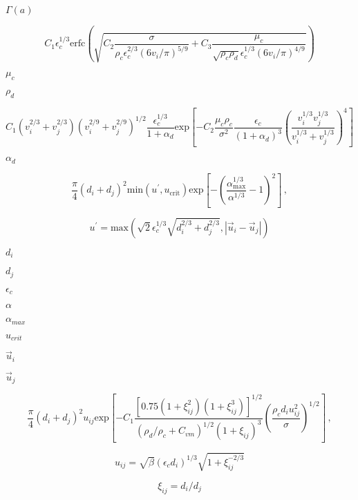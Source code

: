 \documentclass{article}
\begin{document}
$        \Gamma(a)   $
\pagebreak

\[
    C_1 \epsilon_c^{1/3}
    \mathrm{erfc}
    \left(
        \sqrt
        {
            C_2 \frac{\sigma}{\rho_c \epsilon_c^{2/3} (6v_i/\pi)^{5/9}}
          + C_3 \frac{\mu_c}{\sqrt{\rho_c \rho_d}
            \epsilon_c^{1/3} (6v_i/\pi)^{4/9}}
        }
    \right)
\]
\pagebreak

$        \mu_c       $
\pagebreak

$        \rho_d      $
\pagebreak

\[
    C_1 (v_i^{2/3} + v_j^{2/3}) (v_i^{2/9} + v_j^{2/9})^{1/2}
    \frac{\epsilon_c^{1/3}}{1 + \alpha_d}
    \textrm{exp}
    \left[
      - C_2 \frac{\mu_c \rho_c}{\sigma^2}
        \frac{\epsilon_c}{(1 + \alpha_d)^{3}}
        \left(
            \frac{v_i^{1/3} v_j^{1/3}}{v_i^{1/3} + v_j^{1/3}}
        \right)^{4}
    \right]
\]
\pagebreak

$        \alpha_d    $
\pagebreak

\[
    \frac{\pi}{4} (d_i + d_j)^2 \mathrm{min}(u^{\prime}, u_{\mathrm{crit}})
    \mathrm{exp}
    \left[
      - \left(\frac{\alpha_{\mathrm{max}}^{1/3}}{\alpha^{1/3}} - 1\right)^2
    \right]\,,
\]
\pagebreak

\[
    u^{\prime}
  =
    \mathrm{max}
    \left(
        \sqrt{2} \epsilon_c^{1/3} \sqrt{d_i^{2/3} + d_j^{2/3}},
        |\vec{u}_i - \vec{u}_j|
    \right)
\]
\pagebreak

$        d_i           $
\pagebreak

$        d_j           $
\pagebreak

$        \epsilon_c    $
\pagebreak

$        \alpha        $
\pagebreak

$        \alpha_{max}  $
\pagebreak

$        u_{crit}      $
\pagebreak

$        \vec{u}_i     $
\pagebreak

$        \vec{u}_j     $
\pagebreak

\[
    \frac{\pi}{4} (d_i + d_j)^2 u_{ij}
    \mathrm{exp}
    \left[
      - C_1
        \frac
        {[0.75(1 + \xi_{ij}^2)(1 + \xi_{ij}^3)]^{1/2}}
        {(\rho_d/\rho_c + C_{vm})^{1/2} (1 + \xi_{ij})^3}
        \left(\frac{\rho_c d_i u_{ij}^2}{\sigma}\right)^{1/2}
    \right]\,,
\]
\pagebreak

\[
    u_{ij} = \sqrt{\beta} (\epsilon_c d_i)^{1/3} \sqrt{1 + \xi_{ij}^{-2/3}}
\]
\pagebreak

\[
    \xi_{ij} = d_i/d_j
\]
\pagebreak
\end{document}
